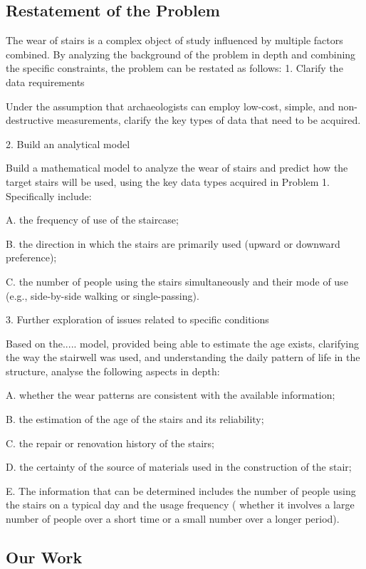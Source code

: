 \documentclass{mcmthesis}
\begin{document}
\subsection{Restatement of the Problem}
The wear of stairs is a complex object of study influenced by multiple factors combined. By analyzing the background of the problem in depth and combining the specific constraints, the problem can be restated as follows:
1. Clarify the data requirements

Under the assumption that archaeologists can employ low-cost, simple, and non-destructive measurements, clarify the key types of data that need to be acquired.

2. Build an analytical model

Build a mathematical model to analyze the wear of stairs and predict how the target stairs will be used, using the key data types acquired in Problem 1. Specifically include:

A. the frequency of use of the staircase;

B. the direction in which the stairs are primarily used (upward or downward preference);

C. the number of people using the stairs simultaneously and their mode of use (e.g., side-by-side walking or single-passing).

3. Further exploration of issues related to specific conditions

Based on the..... model, provided being able to estimate the age exists, clarifying the way the stairwell was used, and understanding the daily pattern of life in the structure, analyse the following aspects in depth:

A. whether the wear patterns are consistent with the available information;

B. the estimation of the age of the stairs and its reliability;

C. the repair or renovation history of the stairs;

D. the certainty of the source of materials used in the construction of the stair;

E. The information that can be determined includes the number of people using the stairs on a typical day and the usage frequency ( whether it involves a large number of people over a short time or a small number over a longer period).

\subsection{Our Work}
\end{document}
